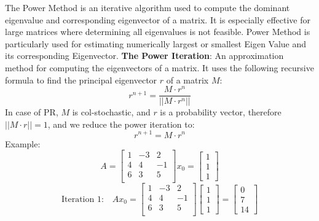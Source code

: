 \documentclass[unicode,11pt,a4paper,oneside,numbers=endperiod,openany]{scrartcl}
\begin{document}
The Power Method is an iterative algorithm used to compute the dominant eigenvalue and corresponding eigenvector of a matrix. It is especially effective for large matrices where determining all eigenvalues is not feasible.
\newline
Power Method is particularly used for estimating numerically largest or smallest Eigen Value and its corresponding Eigenvector.
\newline
\textbf{The Power Iteration}: An approximation method for computing the eigenvectors of a matrix. It uses the following recursive formula to find the principal eigenvector $r$ of a matrix $M$:
\[
 r^{n+1}=\frac{M\cdot r^n}{||M\cdot r^n||}
\]
In case of PR, $M$ is col-stochastic, and $r$ is a probability vector, therefore $||M \cdot r||=1$, and we reduce the power iteration to:
\[
 r^{n+1} = M \cdot r^n
\]
Example:
\[
 A = \begin{bmatrix}
      1 & -3 & 2 \\
      4 & 4 & -1 \\
      6 & 3 &  5 \\
     \end{bmatrix}
     x_0 =
     \begin{bmatrix}
            1 \\ 1 \\ 1
    \end{bmatrix}
    \]
    \[
    \text{Iteration 1:}\quad
    Ax_0 =
    \begin{bmatrix}
      1 & -3 & 2 \\
      4 & 4 & -1 \\
      6 & 3 &  5 \\
     \end{bmatrix}
     \begin{bmatrix}
            1 \\ 1 \\ 1
    \end{bmatrix}  =
    \begin{bmatrix}
     0 \\ 7 \\ 14
    \end{bmatrix}
\]
\end{document}
